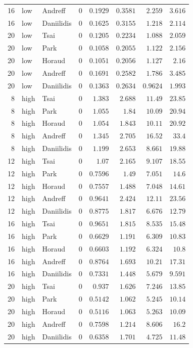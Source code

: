 \begin{longtable}{rllrrrrr}
16 & low & Andreff & 0 & $0.1929$ & $0.3581$ & $2.259$ & $3.616$ \\
16 & low & Daniilidis & 0 & $0.1625$ & $0.3155$ & $1.218$ & $2.114$ \\
20 & low & Tsai & 0 & $0.1205$ & $0.2234$ & $1.088$ & $2.059$ \\
20 & low & Park & 0 & $0.1058$ & $0.2055$ & $1.122$ & $2.156$ \\
20 & low & Horaud & 0 & $0.1051$ & $0.2056$ & $1.127$ & $2.16$ \\
20 & low & Andreff & 0 & $0.1691$ & $0.2582$ & $1.786$ & $3.485$ \\
20 & low & Daniilidis & 0 & $0.1363$ & $0.2634$ & $0.9624$ & $1.993$ \\
8 & high & Tsai & 0 & $1.383$ & $2.688$ & $11.49$ & $23.85$ \\
8 & high & Park & 0 & $1.055$ & $1.84$ & $10.09$ & $20.94$ \\
8 & high & Horaud & 0 & $1.054$ & $1.843$ & $10.11$ & $20.92$ \\
8 & high & Andreff & 0 & $1.345$ & $2.705$ & $16.52$ & $33.4$ \\
8 & high & Daniilidis & 0 & $1.199$ & $2.653$ & $8.661$ & $19.88$ \\
12 & high & Tsai & 0 & $1.07$ & $2.165$ & $9.107$ & $18.55$ \\
12 & high & Park & 0 & $0.7596$ & $1.49$ & $7.051$ & $14.6$ \\
12 & high & Horaud & 0 & $0.7557$ & $1.488$ & $7.048$ & $14.61$ \\
12 & high & Andreff & 0 & $0.9641$ & $2.424$ & $12.11$ & $23.56$ \\
12 & high & Daniilidis & 0 & $0.8775$ & $1.817$ & $6.676$ & $12.79$ \\
16 & high & Tsai & 0 & $0.9651$ & $1.815$ & $8.535$ & $15.48$ \\
16 & high & Park & 0 & $0.6629$ & $1.191$ & $6.309$ & $10.83$ \\
16 & high & Horaud & 0 & $0.6603$ & $1.192$ & $6.324$ & $10.8$ \\
16 & high & Andreff & 0 & $0.8764$ & $1.693$ & $10.21$ & $17.31$ \\
16 & high & Daniilidis & 0 & $0.7331$ & $1.448$ & $5.679$ & $9.591$ \\
20 & high & Tsai & 0 & $0.937$ & $1.626$ & $7.246$ & $13.85$ \\
20 & high & Park & 0 & $0.5142$ & $1.062$ & $5.245$ & $10.14$ \\
20 & high & Horaud & 0 & $0.5116$ & $1.063$ & $5.263$ & $10.09$ \\
20 & high & Andreff & 0 & $0.7598$ & $1.214$ & $8.606$ & $16.2$ \\
20 & high & Daniilidis & 0 & $0.6358$ & $1.701$ & $4.725$ & $11.48$ \\
\end{longtable}
\endgroup
